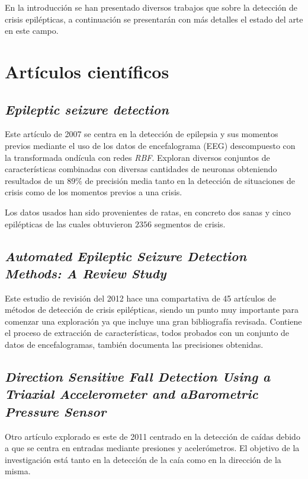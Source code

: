 
En la introducción se han presentado diversos trabajos que sobre la detección de crisis epilépticas, a continuación se presentarán con más detalles el estado del arte en este campo.

\section{Artículos científicos}\label{cap:trabrel}
\subsection{\textbf{\textit{Epileptic seizure detection}}~\cite{schuyler2007epileptic}}
Este artículo de 2007 se centra en la detección de epilepsia y sus momentos previos mediante el uso de los datos de encefalograma (EEG) descompuesto con la transformada ondícula con redes \textit{RBF}. Exploran diversos conjuntos de características combinadas con diversas cantidades de neuronas obteniendo resultados de un $89\%$ de precisión media tanto en la detección de situaciones de crisis como de los momentos previos a una crisis.

Los datos usados han sido provenientes de ratas, en concreto dos sanas y cinco epilépticas de las cuales obtuvieron $2356$ segmentos de crisis.

\subsection{\textbf{\textit{Automated Epileptic Seizure Detection Methods: A Review Study}}~\cite{tzallas2012review}}
Este estudio de revisión del 2012 hace una compartativa de 45 artículos de métodos de detección de crisis epilépticas, siendo un punto muy importante para comenzar una exploración ya que incluye una gran bibliografía revisada. Contiene el proceso de extracción de características, todos probados con un conjunto de datos de encefalogramas, también documenta las precisiones obtenidas. 

\subsection{\textbf{\textit{Direction  Sensitive  Fall  Detection  Using  a  Triaxial  Accelerometer  and  aBarometric  Pressure  Sensor}}~\cite{tolkiehn2011fall}}
Otro artículo explorado es este de 2011 centrado en la detección de caídas debido a que se centra en entradas mediante presiones y acelerómetros. El objetivo de la investigación está tanto en la detección de la caía como en la dirección de la misma. 

